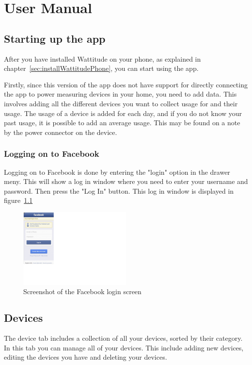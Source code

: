 \chapter{User Manual}
\label{sec:userManual}
\section{Starting up the app}
After you have installed Wattitude on your phone, as explained in chapter~\ref{sec:installWattitudePhone}, you can start using the app. 

Firstly, since this version of the app does not have support for directly connecting the app to power measuring devices in your home, you need to add data. This involves adding all the different devices you want to collect usage for and their usage. The usage of a device is added for each day, and if you do not know your past usage, it is possible to add an average usage. This may be found on a note by the power connector on the device.

\subsection{Logging on to Facebook}
Logging on to Facebook is done by entering the "login" option in the drawer meny. This will show a log in window where you need to enter your username and password. Then press the "Log In" button. This log in window is displayed in figure~\ref{fig:fblogin}

\begin{figure}[H]
\centering
\includegraphics[width=0.5\textwidth, clip, trim=0cm 5.5cm 20.5cm 0cm]{appendix/usermanual/fig/Facebooklogin.png}
\caption{Screenshot of the Facebook login screen}
\label{fig:fblogin}
\end{figure}

\newpage
\section{Devices}
\label{sec:devices}
The device tab includes a collection of all your devices, sorted by their category. In this tab you can manage all of your devices. This include adding new devices, editing the devices you have and deleting your devices. 

